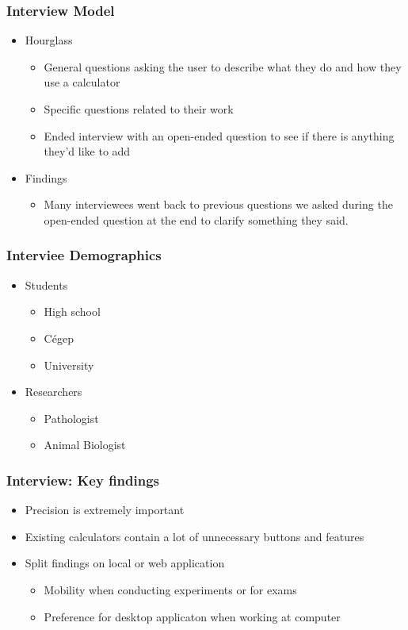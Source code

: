 \documentclass{beamer}
\begin{document}
\begin{frame}
\frametitle{Interview Model}
\begin{itemize}
 \item Hourglass
  \begin{itemize}
   \item General questions asking the user to describe what they do and how they use a calculator
   \item Specific questions related to their work
   \item Ended interview with an open-ended question to see if there is anything they'd like to add
  \end{itemize}
 \item Findings
  \begin{itemize}
   \item Many interviewees went back to previous questions we asked during the open-ended question at the end to clarify something they said.
  \end{itemize}
\end{itemize}
\end{frame}


\begin{frame}
\frametitle{Interviee Demographics}
\begin{itemize}
 \item Students
  \begin{itemize}
   \item High school
   \item Cégep
   \item University
  \end{itemize}
 \item Researchers
\begin{itemize}
 \item Pathologist
    \item Animal Biologist
  \end{itemize}
\end{itemize}
\end{frame}


\begin{frame}
\frametitle{Interview: Key findings}
\begin{itemize}
 \item Precision is extremely important
 \item Existing calculators contain a lot of unnecessary buttons and features
 \item Split findings on local or web application
  \begin{itemize}
   \item Mobility when conducting experiments or for exams
   \item Preference for desktop applicaton when working at computer
  \end{itemize}
\end{itemize}
\end{frame}
\end{document}
